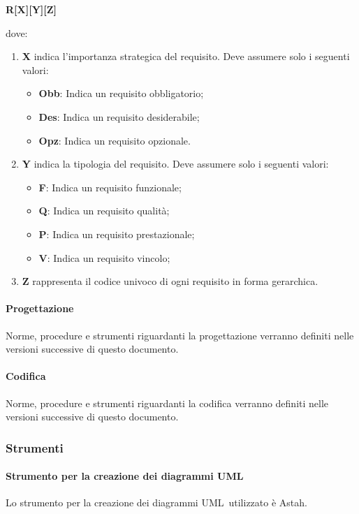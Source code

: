 \documentclass[../NormeProgetto.tex]{subfiles}
\begin{document}
				\begin{center}\textbf{R[X][Y][Z]}\end{center} dove:
					\begin{enumerate}
						\item \textbf{X} indica l'importanza strategica del requisito. Deve assumere solo i seguenti valori:
						\begin{itemize}
							\item \textbf{Obb}: Indica un requisito obbligatorio;
							\item \textbf{Des}: Indica un requisito desiderabile;
							\item \textbf{Opz}: Indica un requisito opzionale.
						\end{itemize}
						\item \textbf{Y} indica la tipologia del requisito. Deve assumere solo i seguenti valori:
						\begin{itemize}
							\item \textbf{F}: Indica un requisito funzionale;
							\item \textbf{Q}: Indica un requisito qualità;
							\item \textbf{P}: Indica un requisito prestazionale;
							\item \textbf{V}: Indica un requisito vincolo;
						\end{itemize}
						\item \textbf{Z} rappresenta il codice univoco di ogni requisito in forma gerarchica.
					\end{enumerate}
			\paragraph{Progettazione}
			Norme, procedure e strumenti riguardanti la progettazione verranno definiti nelle versioni successive di questo documento.
			\paragraph{Codifica}
			Norme, procedure e strumenti riguardanti la codifica verranno definiti nelle versioni successive di questo documento.
		\subsubsection{Strumenti}
			\paragraph{Strumento per la creazione dei diagrammi UML}
			Lo strumento per la creazione dei diagrammi UML\g\ utilizzato è Astah\g.
\end{document}
